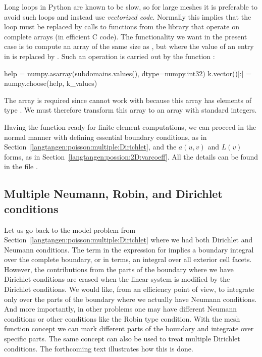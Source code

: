 Long loops in Python are known to be slow, so for large meshes
it is preferable to avoid such loops and instead use \emph{vectorized code}.
Normally this implies that the loop must be replaced by
calls to functions from the  library that operate on complete
arrays (in efficient C code). The functionality we want in the present
case is to compute an array of the same size as
, but where the value  of an entry
in  is replaced by .
Such an operation is carried out by the  function :
\begin{python}
help = numpy.asarray(subdomains.values(), dtype=numpy.int32)
k.vector()[:] = numpy.choose(help, k_values)
\end{python}
The  array is required since  cannot work with
 because this array has elements of
type . We must therefore transform this array to an array
 with standard  integers.

Having the  function ready for finite element computations, we
can proceed in the normal manner with defining essential boundary
conditions, as in Section~\ref{langtangen:poisson:multiple:Dirichlet},
and the $a(u,v)$ and $L(v)$ forms, as in
Section~\ref{langtangen:possion:2D:varcoeff}.
All the details can be found in the file .

\subsection{Multiple Neumann, Robin, and Dirichlet conditions}
\label{langtangen:poisson:mat:neumann}

Let us go back to the model problem from
Section~\ref{langtangen:poisson:multiple:Dirichlet}
where we had both Dirichlet and Neumann conditions.
The term  in the expression for  implies a
boundary integral over the complete boundary, or in \fenics{} terms,
an integral over all exterior cell facets.
However, the contributions from the parts of the boundary where we have
Dirichlet conditions are erased when the linear system is modified by
the Dirichlet conditions.
We would like, from an efficiency point of view, to integrate 
only over the parts of the boundary where we actually have Neumann conditions.
And more importantly,
in other problems one may have different Neumann conditions or
other conditions like the Robin type condition.
With the mesh function concept we can mark
different parts of the boundary and integrate over specific parts.
The same concept can also be used to treat multiple Dirichlet conditions.
The forthcoming text illustrates how this is done.

